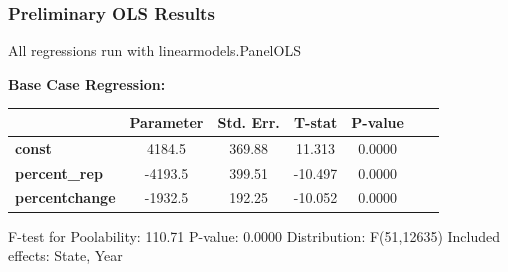 \documentclass{beamer}
\begin{document}
\begin{frame}
\frametitle{Preliminary OLS Results}

All regressions run with linearmodels.PanelOLS

\vspace{5mm}

\textbf{Base Case Regression:}

\vspace{5mm}

\begin{center}

\begin{tabular}{lcccccc}
                       & \textbf{Parameter} & \textbf{Std. Err.} & \textbf{T-stat} & \textbf{P-value} \\
\midrule

\textbf{const}         &       4184.5       &       369.88       &      11.313     &      0.0000      \\  
\textbf{percent\_rep}  &      -4193.5       &       399.51       &     -10.497     &      0.0000      \\
\textbf{percentchange} &      -1932.5       &       192.25       &     -10.052     &      0.0000      \\
\bottomrule
\end{tabular}
\end{center}

F-test for Poolability: 110.71 \newline
P-value: 0.0000 \newline
Distribution: F(51,12635) 
\newline
\newline
Included effects: State, Year

\end{frame}
\end{document}
